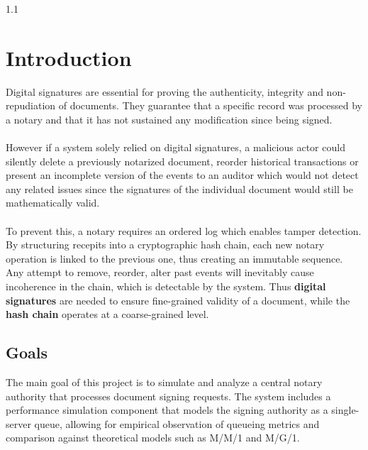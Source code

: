 \documentclass[11pt,a4paper]{article}
\begin{document}
\begin{spacing}{1.1}

\section{Introduction}

Digital signatures are essential for proving the authenticity, integrity and non-repudiation of documents. They guarantee that a specific record was processed by a notary and that it has not sustained any modification since being signed. \\\\
However if a system solely relied on digital signatures, a malicious actor could silently delete a previously notarized document, reorder historical transactions or present an incomplete version of the events to an auditor which would not detect any related issues since the signatures of the individual document would still be mathematically valid.\\\\
To prevent this, a notary requires an ordered log which enables tamper detection. By structuring recepits into a cryptographic hash chain, each new notary operation is linked to the previous one, thus creating an immutable sequence. Any attempt to remove, reorder, alter past events will inevitably cause incoherence in the chain, which is detectable by the system. Thus \textbf{digital signatures} are needed to ensure fine-grained validity of a document, while the \textbf{hash chain} operates at a coarse-grained level.

\subsection{Goals}
The main goal of this project is to simulate and analyze a central notary authority that processes document signing requests. The system includes a performance simulation component that models the signing authority as a single-server queue, allowing for empirical observation of queueing metrics and comparison against theoretical models such as M/M/1 and M/G/1.


\end{spacing}
\end{document}
